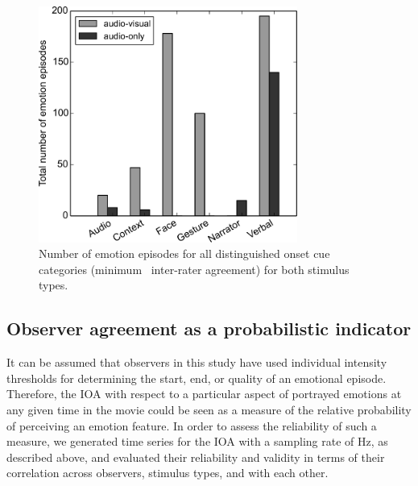 \documentclass[10pt,a4paper,twocolumn]{article}
\begin{document}
\begin{figure}
  \centering
  \includegraphics[width=85mm]{figures/labeledoncue_episodes}
  \caption{Number of emotion episodes for all distinguished onset cue categories
    (minimum \AVAggThresh\ inter-rater agreement) for both stimulus types.}
  \label{fig:threshlabeledoncue}
\end{figure}

\subsection*{Observer agreement as a probabilistic indicator}

It can be assumed that observers in this study have used individual intensity
thresholds for determining the start, end, or quality of an emotional episode.
Therefore, the IOA with respect to a particular aspect of portrayed emotions at
any given time in the movie could be seen as a measure of the relative
probability of perceiving an emotion feature. In order to assess the
reliability of such a measure, we generated time series for the IOA with a
sampling rate of \unit[1]{Hz}, as described above, and evaluated their
reliability and validity in terms of their correlation across observers,
stimulus types, and with each other.
\end{document}
